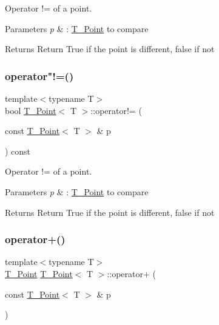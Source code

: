 Operator != of a point. 


\begin{DoxyParams}{Parameters}
{\em p} & \+: \hyperlink{classT__Point}{T\+\_\+\+Point} to compare \\
\hline
\end{DoxyParams}
\begin{DoxyReturn}{Returns}
Return True if the point is different, false if not 
\end{DoxyReturn}
\mbox{\label{classT__Point_ab92f1605c6f5008b42105b4c7a7fc1b2}} 
\subsubsection{\texorpdfstring{operator"!=()}{operator!=()}\hspace{0.1cm}{\footnotesize\ttfamily [2/2]}}
{\footnotesize\ttfamily template$<$typename T$>$ \\
bool \hyperlink{classT__Point}{T\+\_\+\+Point}$<$ T $>$\+::operator!= (\begin{DoxyParamCaption}\item[{const \hyperlink{classT__Point}{T\+\_\+\+Point}$<$ T $>$ \&}]{p }\end{DoxyParamCaption}) const\hspace{0.3cm}{\ttfamily [inline]}}



Operator != of a point. 


\begin{DoxyParams}{Parameters}
{\em p} & \+: \hyperlink{classT__Point}{T\+\_\+\+Point} to compare \\
\hline
\end{DoxyParams}
\begin{DoxyReturn}{Returns}
Return True if the point is different, false if not 
\end{DoxyReturn}
\mbox{\label{classT__Point_a1f94a7a19cc8711e7784f700ea59297a}} 
\subsubsection{\texorpdfstring{operator+()}{operator+()}\hspace{0.1cm}{\footnotesize\ttfamily [1/2]}}
{\footnotesize\ttfamily template$<$typename T$>$ \\
\hyperlink{classT__Point}{T\+\_\+\+Point} \hyperlink{classT__Point}{T\+\_\+\+Point}$<$ T $>$\+::operator+ (\begin{DoxyParamCaption}\item[{const \hyperlink{classT__Point}{T\+\_\+\+Point}$<$ T $>$ \&}]{p }\end{DoxyParamCaption})\hspace{0.3cm}{\ttfamily [inline]}}



